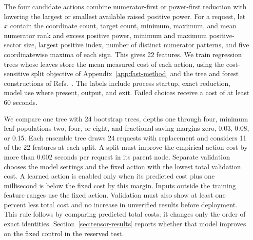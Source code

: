 The four candidate actions combine numerator-first or power-first reduction with lowering the largest or smallest available raised positive power. For a request, let $x$ contain the coordinate count, target count, minimum, maximum, and mean numerator rank and excess positive power, minimum and maximum positive-sector size, largest positive index, number of distinct numerator patterns, and five coordinatewise maxima of each sign. This gives 22 features. We train regression trees whose leaves store the mean measured cost of each action, using the cost-sensitive split objective of Appendix~\ref{app:fast-method} and the tree and forest constructions of Refs.~\cite{CART1984,Breiman2001Forest}. The labels include process startup, exact reduction, model use where present, output, and exit. Failed choices receive a cost of at least 60 seconds.

We compare one tree with 24 bootstrap trees, depths one through four, minimum leaf populations two, four, or eight, and fractional-saving margins zero, 0.03, 0.08, or 0.15. Each ensemble tree draws 24 requests with replacement and considers 11 of the 22 features at each split. A split must improve the empirical action cost by more than 0.002 seconds per request in its parent node. Separate validation chooses the model settings and the fixed action with the lowest total validation cost. A learned action is enabled only when its predicted cost plus one millisecond is below the fixed cost by this margin. Inputs outside the training feature ranges use the fixed action. Validation must also show at least one percent less total cost and no increase in unverified results before deployment. This rule follows by comparing predicted total costs; it changes only the order of exact identities. Section~\ref{sec:tensor-results} reports whether that model improves on the fixed control in the reserved test.

